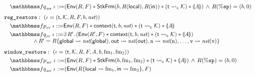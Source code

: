 \begin{figure}[!t]
\[\begin{array}{l}
            \\[-9pt]
            \quad
            \relspecpost_{\textit{ws}} \ \lgvl \define 
            (\Env{\RFile, \Wstack} \sepstar 
            \RelStkFm{\block}{\RFile(\localRN)}{\RFile(\inRN)}
            \sepstar (\astCurCont{\thrdid}{\hthrdlocalst}) \sepstar 
            \safePrimAst{\primcom}) \, \land \, \RFile(\spreg) = (\block, 0) \\
            \\[-5pt]
            \texttt{reg\_restore}: \ (\lgvl = (\thrdid, \hthrdlocalst, \RFile, \Wstack, 
                \block, \nst)) \\
            \\[-9pt]
            \quad
            \relspecpre_{\textit{rr}} \ \lgvl \define \Env{\RFile, \Wstack} \sepstar 
            \relcontext{\thrdid}{\block}{\nst} \sepstar 
            (\astCurCont{\thrdid}{\hthrdlocalst}) \sepstar \safePrimAst{\primcom} \\
            \\[-9pt]
            \quad
            \relspecpost_{\textit{rr}} \ \lgvl \define \exists \, \RFile'. \,  (\Env{\RFile', \Wstack}
            \sepstar \relcontext{\thrdid}{\block}{\nst} \sepstar 
            (\astCurCont{\thrdid}{\hthrdlocalst}) \sepstar \safePrimAst{\primcom}
            )  \\
            \hspace*{5em}
            \, \land \, 
            \RFile' = \RFile\{ \globalRN \rightsquigarrow \nst(\globalRN), 
                \outRN \rightsquigarrow \nst(\outRN), \regn \rightsquigarrow \nst(\regn), 
                \dots, \regv \rightsquigarrow \nst(\regv) \} \\
            \\[-5pt]
            \texttt{window\_restore}: \ (\lgvl = (\thrdid, \hthrdlocalst, \RFile, \Wstack, 
            \primcom, \block, \fm_1, \fm_2)) \\
            \\[-9pt]
            \quad
            \relspecpre_{\textit{wr}} \ \lgvl \define 
            (\Env{\RFile, \Wstack} \sepstar \RelStkFm{\block}{\fm_1}{\fm_2} 
            \sepstar (\astCurCont{\thrdid}{\hthrdlocalst}) \sepstar 
            \safePrimAst{\primcom}) \, \land \, \RFile(\spreg) = (\block, 0) \\
            \\[-9pt]
            \quad
            \relspecpost_{\textit{wr}} \ \lgvl \define 
            (\Env{\RFile\{ \localRN \rightsquigarrow \fm_1, \inRN \rightsquigarrow \fm_2 \}, \Wstack} \

\end{array}\]
\end{figure}

